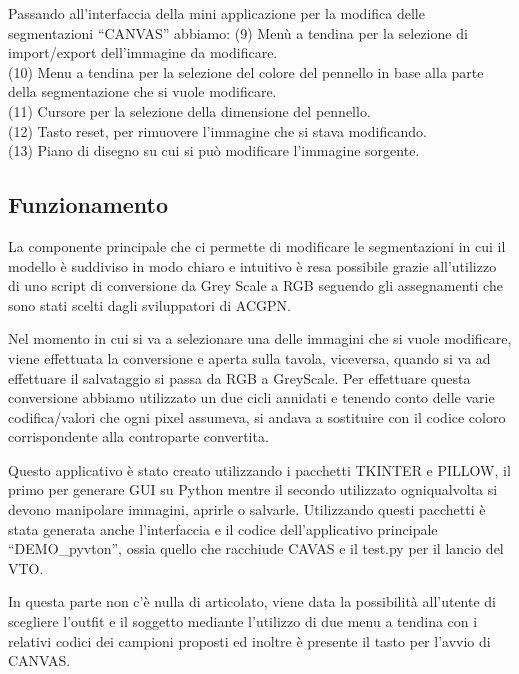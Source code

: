 \documentclass[final, 11pt]{article}
\begin{document}
	
	
	Passando all’interfaccia della mini applicazione per la modifica delle segmentazioni “CANVAS” abbiamo:
\newline
	(9) Menù a tendina per la selezione di import/export dell’immagine da modificare. \\
	(10) Menu a tendina per la selezione del colore del pennello in base alla parte della segmentazione che si vuole modificare. 
\\
	(11) Cursore per la selezione della dimensione del pennello. 
\\
	(12) Tasto reset, per rimuovere l’immagine che si stava modificando. \\
	(13) Piano di disegno su cui si può modificare l’immagine sorgente.
\\
	
	\subsection{Funzionamento}
	La componente principale che ci permette di modificare le segmentazioni in cui il modello è suddiviso in modo chiaro e intuitivo è resa possibile grazie all’utilizzo di uno script di conversione da Grey Scale a RGB seguendo gli assegnamenti che sono stati scelti dagli sviluppatori di ACGPN. 
	
	Nel momento in cui si va a selezionare una delle immagini che si vuole modificare, viene effettuata la conversione e aperta sulla tavola, viceversa, quando si va ad effettuare il salvataggio si passa da RGB a GreyScale. Per effettuare questa conversione abbiamo utilizzato un due cicli annidati e tenendo conto delle varie codifica/valori che ogni pixel assumeva, si andava a sostituire con il codice coloro corrispondente alla controparte convertita.
	
	Questo applicativo è stato creato utilizzando i pacchetti TKINTER e PILLOW, il primo per generare GUI su Python mentre il secondo utilizzato ogniqualvolta si devono manipolare immagini, aprirle o salvarle.
	Utilizzando questi pacchetti è stata generata anche l’interfaccia e il codice dell’applicativo principale “DEMO\_pyvton”, ossia quello che racchiude CAVAS e il test.py per il lancio del VTO.
	
	In questa parte non c’è nulla di articolato, viene data la possibilità all’utente di scegliere l’outfit e il soggetto mediante l’utilizzo di due menu a tendina con i relativi codici dei campioni proposti ed inoltre è presente il tasto per l’avvio di CANVAS.
	
\end{document}
